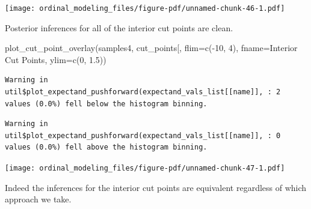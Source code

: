 \documentclass[
  letterpaper,
  DIV=11,
  numbers=noendperiod]{scrartcl}
\newenvironment{Shaded}{\begin{snugshade}}{\end{snugshade}}
\newcommand{\AttributeTok}[1]{\textcolor[rgb]{0.40,0.45,0.13}{#1}}
\newcommand{\DecValTok}[1]{\textcolor[rgb]{0.68,0.00,0.00}{#1}}
\newcommand{\FloatTok}[1]{\textcolor[rgb]{0.68,0.00,0.00}{#1}}
\newcommand{\FunctionTok}[1]{\textcolor[rgb]{0.28,0.35,0.67}{#1}}
\newcommand{\NormalTok}[1]{\textcolor[rgb]{0.00,0.23,0.31}{#1}}
\newcommand{\SpecialCharTok}[1]{\textcolor[rgb]{0.37,0.37,0.37}{#1}}
\newcommand{\StringTok}[1]{\textcolor[rgb]{0.13,0.47,0.30}{#1}}
\begin{document}
\texttt{[image: ordinal\_modeling\_files/figure-pdf/unnamed-chunk-46-1.pdf]}

Posterior inferences for all of the interior cut points are clean.

\begin{Shaded}
\begin{Highlighting}[]
\FunctionTok{plot\_cut\_point\_overlay}\NormalTok{(samples4, }\StringTok{\textquotesingle{}cut\_points[\textquotesingle{}}\NormalTok{,}
                       \AttributeTok{flim=}\FunctionTok{c}\NormalTok{(}\SpecialCharTok{{-}}\DecValTok{10}\NormalTok{, }\DecValTok{4}\NormalTok{), }\AttributeTok{fname=}\StringTok{\textquotesingle{}Interior Cut Points\textquotesingle{}}\NormalTok{,}
                       \AttributeTok{ylim=}\FunctionTok{c}\NormalTok{(}\DecValTok{0}\NormalTok{, }\FloatTok{1.5}\NormalTok{))}
\end{Highlighting}
\end{Shaded}

\begin{verbatim}
Warning in util$plot_expectand_pushforward(expectand_vals_list[[name]], : 2
values (0.0%) fell below the histogram binning.
\end{verbatim}

\begin{verbatim}
Warning in util$plot_expectand_pushforward(expectand_vals_list[[name]], : 0
values (0.0%) fell above the histogram binning.
\end{verbatim}

\texttt{[image: ordinal\_modeling\_files/figure-pdf/unnamed-chunk-47-1.pdf]}

Indeed the inferences for the interior cut points are equivalent
regardless of which approach we take.
\end{document}
